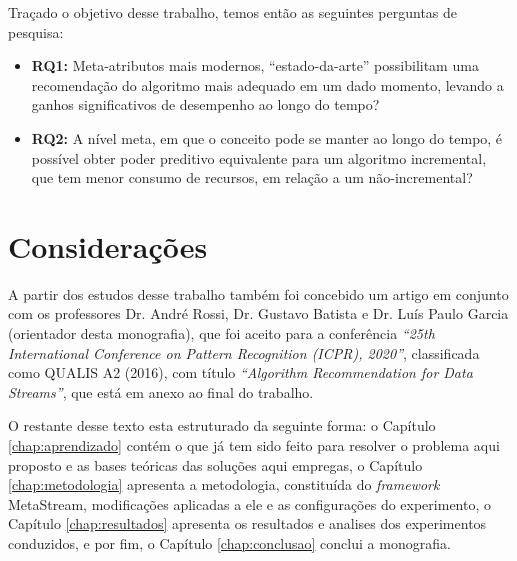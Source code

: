 Traçado o objetivo desse trabalho, temos então as seguintes perguntas de pesquisa:
\begin{itemize}
    \item \textbf{RQ1:} Meta-atributos mais modernos, ``estado-da-arte'' possibilitam uma recomendação do algoritmo mais adequado em um dado momento, levando a ganhos significativos de desempenho ao longo do tempo?
    \item \textbf{RQ2:} A nível meta, em que o conceito pode se manter ao longo do tempo, é possível obter poder preditivo equivalente para um algoritmo incremental, que tem menor consumo de recursos, em relação a um não-incremental?
\end{itemize}

\section{Considerações}

A partir dos estudos desse trabalho também foi concebido um artigo em conjunto com os professores Dr. André Rossi, Dr. Gustavo Batista e Dr. Luís Paulo Garcia (orientador desta monografia), que foi aceito para a conferência \textit{``25th International Conference on Pattern Recognition (ICPR), 2020''}, classificada como QUALIS A2 (2016), com título \textit{``Algorithm Recommendation for Data Streams''}, que está em anexo ao final do trabalho. 

O restante desse texto esta estruturado da seguinte forma: o Capítulo \ref{chap:aprendizado} contém o que já tem sido feito para resolver o problema aqui proposto e as bases teóricas das soluções aqui empregas, o Capítulo \ref{chap:metodologia} apresenta a metodologia, constituída do \textit{framework} MetaStream, modificações aplicadas a ele e as configurações do experimento, o Capítulo \ref{chap:resultados} apresenta os resultados e analises dos experimentos conduzidos, e por fim, o Capítulo \ref{chap:conclusao} conclui a monografia.
